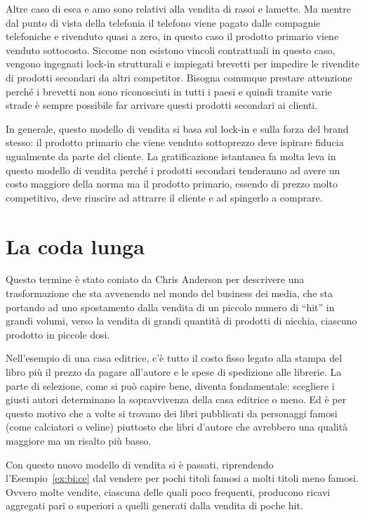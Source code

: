 Altre caso di esca e amo sono relativi alla vendita di rasoi e lamette. Ma
mentre dal punto di vista della telefonia il telefono viene pagato dalle
compagnie telefoniche e rivenduto quasi a zero, in questo caso il prodotto
primario viene venduto sottocosto. Siccome non esistono vincoli contrattuali in
questo caso, vengono ingegnati lock-in strutturali e impiegati brevetti per
impedire le rivendite di prodotti secondari da altri competitor. Bisogna
comunque prestare attenzione perché i brevetti non sono riconosciuti in tutti i
paesi e quindi tramite varie strade è sempre possibile far arrivare questi
prodotti secondari ai clienti.

In generale, questo modello di vendita si basa sul lock-in e sulla forza del
brand stesso: il prodotto primario che viene venduto sottoprezzo deve ispirare
fiducia ugualmente da parte del cliente. La gratificazione istantanea fa molta
leva in questo modello di vendita perché i prodotti secondari tenderanno ad
avere un costo maggiore della norma ma il prodotto primario, essendo di prezzo
molto competitivo, deve riuscire ad attrarre il cliente e ad spingerlo a
comprare.

\section{La coda lunga}

Questo termine è stato coniato da Chris Anderson per descrivere una
trasformazione che sta avvenendo nel mondo del business dei media, che sta
portando ad uno spostamento dalla vendita di un piccolo numero di ``hit'' in
grandi volumi, verso la vendita di grandi quantità di prodotti di nicchia,
ciascuno prodotto in piccole dosi.

\begin{example}\label{ex:bi:ce}
Nell'esempio di una casa editrice, c'è tutto il costo fisso legato alla
stampa del libro più il prezzo da pagare all'autore e le spese di spedizione
alle librerie. La parte di selezione, come si può capire bene, diventa
fondamentale: scegliere i giusti autori determinano la sopravvivenza della casa
editrice o meno. Ed è per questo motivo che a volte si trovano dei libri
pubblicati da personaggi famosi (come calciatori o veline) piuttosto che libri
d'autore che avrebbero una qualità maggiore ma un risalto più basso.
\end{example}

Con questo nuovo modello di vendita si è passati, riprendendo
l'Esempio~\ref{ex:bi:ce} dal vendere per pochi titoli famosi a molti titoli
meno famosi. Ovvero molte vendite, ciascuna delle quali poco frequenti,
producono ricavi aggregati pari o superiori a quelli generati dalla vendita di
poche hit.

